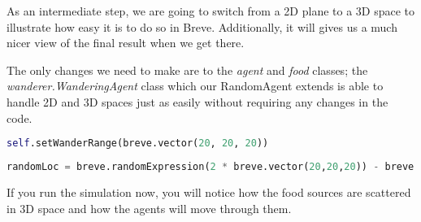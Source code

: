 As an intermediate step, we are going to switch from a 2D plane to a 3D space to illustrate how easy it is to do so in Breve. Additionally, it will gives us a much nicer view of the final result when we get there. 

The only changes we need to make are to the \textit{agent} and \textit{food} classes; the \textit{wanderer.WanderingAgent} class which our RandomAgent extends is able to handle 2D and 3D spaces just as easily without requiring any changes in the code. 


\begin{lstlisting}[language=Python]
self.setWanderRange(breve.vector(20, 20, 20))
\end{lstlisting}


\begin{lstlisting}[language=Python]
randomLoc = breve.randomExpression(2 * breve.vector(20,20,20)) - breve.vector(20,20,20)
\end{lstlisting}

If you run the simulation now, you will notice how the food sources are scattered in 3D space and how the agents will move through them.